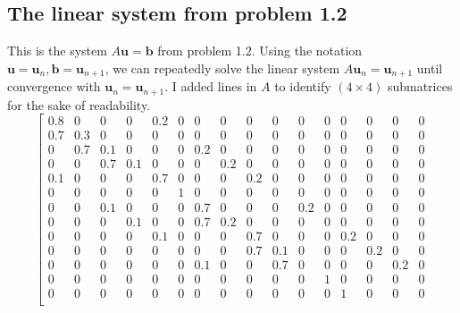 \documentclass[letterpaper, 10pt]{article}
\begin{document}
\subsection{The linear system from problem 1.2}
\label{ssec:matrix}
This is the system $A\mathbf{u} = \mathbf{b}$ from problem 1.2. Using the notation $\mathbf{u} = \mathbf{u}_n, \mathbf{b} = \mathbf{u}_{n+1}$, we can repeatedly solve the linear system $A \mathbf{u}_n = \mathbf{u}_{n+1}$ until convergence with $\mathbf{u}_n = \mathbf{u}_{n+1}$. I added lines in $A$ to identify $(4 \times 4)$ submatrices for the sake of readability. 
\[
\left[
\begin{array}{cccc|cccc|cccc|cccc}
0.8 & 0    & 0   & 0   & 0.2 & 0   & 0   & 0   & 0   & 0   & 0   & 0   & 0   & 0   & 0   & 0   \\ %
0.7 & 0.3  & 0   & 0   & 0   & 0   & 0   & 0   & 0   & 0   & 0   & 0   & 0   & 0   & 0   & 0   \\ %
0   & 0.7  & 0.1 & 0   & 0   & 0   & 0.2 & 0   & 0   & 0   & 0   & 0   & 0   & 0   & 0   & 0   \\ %
0   & 0    & 0.7 & 0.1 & 0   & 0   & 0   & 0.2 & 0   & 0   & 0   & 0   & 0   & 0   & 0   & 0   \\ %
\hline
0.1 & 0    & 0   & 0   & 0.7 & 0   & 0   & 0   & 0.2 & 0   & 0   & 0   & 0   & 0   & 0   & 0   \\ %
0   & 0    & 0   & 0   & 0   & 1   & 0   & 0   & 0   & 0   & 0   & 0   & 0   & 0   & 0   & 0   \\ %
0   & 0    & 0.1 & 0   & 0   & 0   & 0.7 & 0   & 0   & 0   & 0.2 & 0   & 0   & 0   & 0   & 0   \\ %
0   & 0    & 0   & 0.1 & 0   & 0   & 0.7 & 0.2 & 0   & 0   & 0   & 0   & 0   & 0   & 0   & 0   \\ %
\hline
0   & 0    & 0   & 0   & 0.1 & 0   & 0   & 0   & 0.7 & 0   & 0   & 0   & 0.2 & 0   & 0   & 0   \\ %
0   & 0    & 0   & 0   & 0   & 0   & 0   & 0   & 0.7 & 0.1 & 0   & 0   & 0   & 0.2 & 0   & 0   \\ %
0   & 0    & 0   & 0   & 0   & 0   & 0.1 & 0   & 0   & 0.7 & 0   & 0   & 0   & 0   & 0.2 & 0   \\ %
0   & 0    & 0   & 0   & 0   & 0   & 0   & 0   & 0   & 0   & 0   & 1   & 0   & 0   & 0   & 0   \\ %
\hline
0   & 0    & 0   & 0   & 0   & 0   & 0   & 0   & 0   & 0   & 0   & 0   & 1   & 0   & 0   & 0   \\ %

\end{array}\]
\end{document}
